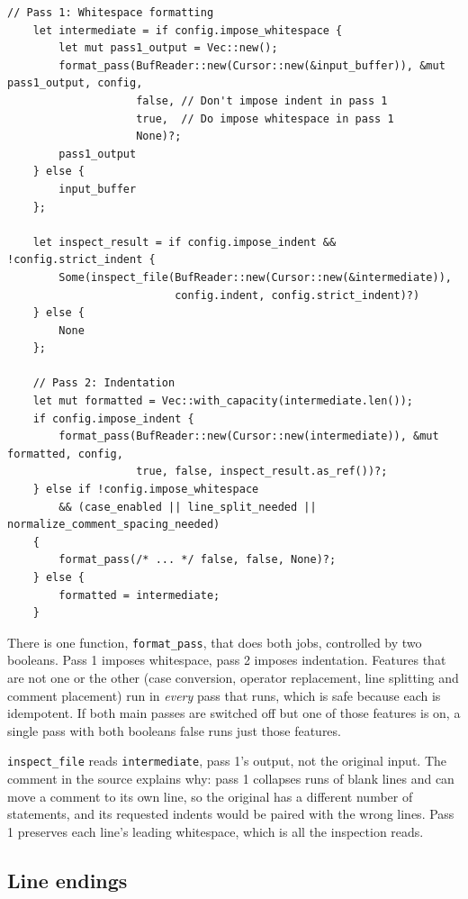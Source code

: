 \documentclass[11pt,a4paper,openany]{book}
\newcommand{\code}[1]{\texttt{\small #1}}
\begin{document}
\begin{lstlisting}[style=rust]
    // Pass 1: Whitespace formatting
    let intermediate = if config.impose_whitespace {
        let mut pass1_output = Vec::new();
        format_pass(BufReader::new(Cursor::new(&input_buffer)), &mut pass1_output, config,
                    false, // Don't impose indent in pass 1
                    true,  // Do impose whitespace in pass 1
                    None)?;
        pass1_output
    } else {
        input_buffer
    };

    let inspect_result = if config.impose_indent && !config.strict_indent {
        Some(inspect_file(BufReader::new(Cursor::new(&intermediate)),
                          config.indent, config.strict_indent)?)
    } else {
        None
    };

    // Pass 2: Indentation
    let mut formatted = Vec::with_capacity(intermediate.len());
    if config.impose_indent {
        format_pass(BufReader::new(Cursor::new(intermediate)), &mut formatted, config,
                    true, false, inspect_result.as_ref())?;
    } else if !config.impose_whitespace
        && (case_enabled || line_split_needed || normalize_comment_spacing_needed)
    {
        format_pass(/* ... */ false, false, None)?;
    } else {
        formatted = intermediate;
    }
\end{lstlisting}

There is one function, \code{format\_pass}, that does both jobs, controlled by
two booleans. Pass 1 imposes whitespace, pass 2 imposes indentation. Features
that are not one or the other (case conversion, operator replacement, line
splitting and comment placement) run in \emph{every} pass that runs, which is
safe because each is idempotent. If both main passes are switched off but one
of those features is on, a single pass with both booleans false runs just
those features.

\begin{keyidea}
\code{inspect\_file} reads \code{intermediate}, pass 1's output, not the
original input. The comment in the source explains why: pass 1 collapses runs
of blank lines and can move a comment to its own line, so the original has a
different number of statements, and its requested indents would be paired with
the wrong lines. Pass 1 preserves each line's leading whitespace, which is all
the inspection reads.
\end{keyidea}

\subsection{Line endings}\label{sec:crlf}
\end{document}
